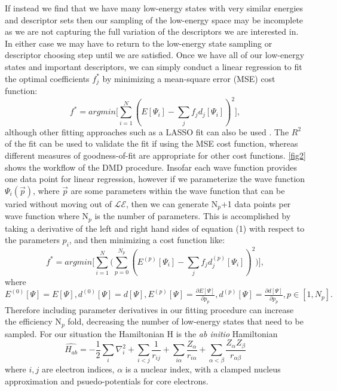 \documentclass{article}
\begin{document}
If instead we find that we have many low-energy states with very similar energies and descriptor sets then our sampling of the low-energy space may be incomplete as we are not capturing the full variation of the descriptors we are interested in. 
In either case we may have to return to the low-energy state sampling or descriptor choosing step until we are satisfied. Once we have all of our low-energy states and important descriptors, we can simply conduct a linear regression to fit the optimal coefficients $f_j^*$ by minimizing a mean-square error (MSE) cost function:
\begin{equation}
f^{*} = argmin \Big[ \sum_{i=1}^{N} ( E[\Psi_i] - \sum_j f_j d_j[\Psi_i])^2  \Big],
\end{equation}
although other fitting approaches such as a LASSO fit can also be used \cite{10.2307/2346178}.
The $R^2$ of the fit can be used to validate the fit if using the MSE cost function, whereas different measures of goodness-of-fit are appropriate for other cost functions.
\ref{fig2} shows the workflow of the DMD procedure.
Insofar each wave function provides one data point for linear regression, however if we parameterize the wave function $\Psi_i(\vec{p})$, where $\vec{p}$ are some parameters within the wave function that can be varied without moving out of $\mathcal{LE}$, then we can generate N$_p$+1 data points per wave function where N$_p$ is the number of parameters.
This is accomplished by taking a derivative of the left and right hand sides of equation (1) with respect to the parameters $p_i$, and then minimizing a cost function like:
\begin{equation}
f^{*} = argmin \Bigg[ \sum_{i=1}^{N} \Big(\sum_{p=0}^{N_p} ( E^{(p)}[\Psi_i] - \sum_j f_j d_j^{(p)}[\Psi_i])^2 \Big) \Bigg],
\end{equation}
where $E^{(0)}[\Psi] = E[\Psi], d^{(0)}[\Psi]= d[\Psi], E^{(p)}[\Psi]=\frac{\partial E[\Psi]}{\partial p_p}, d^{(p)}[\Psi]=\frac{\partial d[\Psi]}{\partial p_p}, p\in [1,N_p].$
Therefore including parameter derivatives in our fitting procedure can increase the efficiency N$_p$ fold, decreasing the number of low-energy states that need to be sampled. 
For our situation the Hamiltonian H is the \textit{ab initio} Hamiltonian 
\begin{equation}
\hat{H_{ab}} = -\frac{1}{2} \sum_i \nabla_i^2 + \sum_{i<j} \frac{1}{r_{ij}} + \sum_{i\alpha} \frac{Z_\alpha}{r_{i\alpha}} + \sum_{\alpha<\beta} \frac{Z_{\alpha}Z_{\beta}}{r_{\alpha \beta}}
\end{equation}
where $i,j$ are electron indices, $\alpha$ is a nuclear index, with a clamped nucleus approximation and psuedo-potentials for core electrons.  
\end{document}
